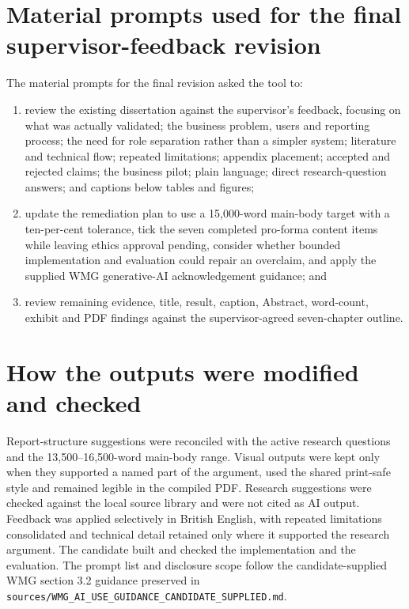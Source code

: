 \section*{Material prompts used for the final supervisor-feedback revision}

The material prompts for the final revision asked the tool to:

\begin{enumerate}[leftmargin=*]
  \item review the existing dissertation against the supervisor's feedback, focusing on what was actually validated; the business problem, users and reporting process; the need for role separation rather than a simpler system; literature and technical flow; repeated limitations; appendix placement; accepted and rejected claims; the business pilot; plain language; direct research-question answers; and captions below tables and figures;
  \item update the remediation plan to use a 15,000-word main-body target with a ten-per-cent tolerance, tick the seven completed pro-forma content items while leaving ethics approval pending, consider whether bounded implementation and evaluation could repair an overclaim, and apply the supplied WMG generative-AI acknowledgement guidance; and
  \item review remaining evidence, title, result, caption, Abstract, word-count, exhibit and PDF findings against the supervisor-agreed seven-chapter outline.
\end{enumerate}

\section*{How the outputs were modified and checked}

Report-structure suggestions were reconciled with the active research questions and the 13,500--16,500-word main-body range. Visual outputs were kept only when they supported a named part of the argument, used the shared print-safe style and remained legible in the compiled PDF. Research suggestions were checked against the local source library and were not cited as AI output. Feedback was applied selectively in British English, with repeated limitations consolidated and technical detail retained only where it supported the research argument. The candidate built and checked the implementation and the evaluation. The prompt list and disclosure scope follow the candidate-supplied WMG section 3.2 guidance preserved in \texttt{sources/WMG\_AI\_USE\_GUIDANCE\_CANDIDATE\_SUPPLIED.md}.
